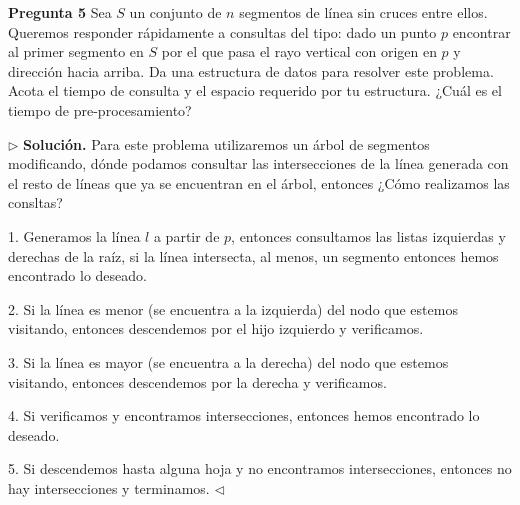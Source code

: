 \textbf{Pregunta 5}
Sea $S$ un conjunto de $n$ segmentos de línea sin cruces entre ellos.
Queremos responder rápidamente a consultas del tipo: dado un punto $p$
encontrar al primer segmento en $S$ por el que pasa el rayo vertical con
origen en $p$ y dirección hacia arriba. Da una estructura de datos para
resolver este problema. Acota el tiempo de consulta y el espacio requerido
por tu estructura. ¿Cuál es el tiempo de pre-procesamiento?\newline

$\rhd$ \textbf{Solución.} Para este problema utilizaremos un árbol de segmentos
modificando, dónde podamos consultar las intersecciones de la línea generada
con el resto de líneas que ya se encuentran en el árbol, entonces ¿Cómo realizamos
las consltas?\newline

1. Generamos la línea $l$ a partir de $p$, entonces consultamos las listas izquierdas y derechas
de la raíz, si la línea intersecta, al menos, un segmento entonces hemos encontrado lo deseado.\newline

2. Si la línea es menor (se encuentra a la izquierda) del nodo que estemos visitando, entonces descendemos
por el hijo izquierdo y verificamos.\newline

3. Si la línea es mayor (se encuentra a la derecha) del nodo que estemos visitando, entonces descendemos
por la derecha y verificamos.\newline

4. Si verificamos y encontramos intersecciones, entonces hemos encontrado lo deseado.\newline

5. Si descendemos hasta alguna hoja y no encontramos intersecciones, entonces no hay intersecciones y terminamos.
$\lhd$
